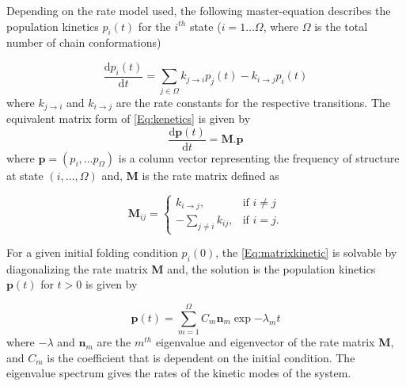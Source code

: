 Depending on the rate model used, the following master-equation describes the population kinetics $p_i(t)$ for the $i^{th}$ state ($i=1\dots \Omega$, where $\Omega$ is the total number of chain conformations)

\begin{equation}
\label{Eq:kenetics}
\frac{\text{d}p_i(t)}{\text{d}t} = \sum\limits_{j \in \Omega}
k_{j \rightarrow i} p_{j}(t) - k_{i \rightarrow j} p_{i}(t)
\end{equation}
where $k_{j\rightarrow i}$ and $k_{i \rightarrow j}$ are the rate constants for the respective transitions. The equivalent matrix form of \autoref{Eq:kenetics} is given by
\begin{equation}
\label{Eq:matrixkinetic}
\frac{\text{d}\textbf{p}(t)}{\text{d}t} = \textbf{M} . \textbf{p}
\end{equation}
where $\textbf{p} = (p_i, \dots p_{\Omega})$ is a column vector representing the frequency of structure at state $(i, \dots , \Omega)$ and, \textbf{M} is the rate matrix defined as

\begin{equation}
\textbf{M}_{ij} =  \begin{cases}
k_{i\rightarrow j},& \text{if } i\neq j\\
- \sum_{j\neq i}{k_{ij}},              & \text{if } i=j.
\end{cases}
\end{equation}

For a given initial folding condition $p_i(0)$, the \autoref{Eq:matrixkinetic} is solvable by diagonalizing the rate matrix \textbf{M} and, the solution is the population kinetics $\textbf{p}(t)$ for $t>0$ is given by

\begin{equation}
\label{Eq:solutionkinetics}
\textbf{p}(t) = \sum_{m=1}^{\Omega} {C_m \textbf{n}_m \exp{-\lambda_m t}}
\end{equation}
where $-\lambda$ and $\textbf{n}_m$ are the $m^{th}$ eigenvalue and eigenvector of the rate matrix \textbf{M}, and $C_m$ is the coefficient that is dependent on the initial condition. The eigenvalue spectrum gives the rates of the kinetic modes of the system.

